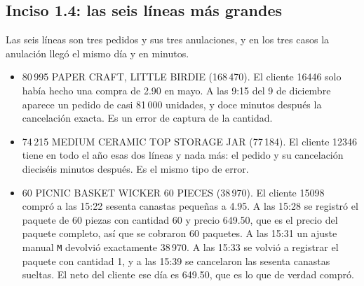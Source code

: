 \documentclass[11pt]{article}
\begin{document}
\subsection*{Inciso 1.4: las seis líneas más grandes}

\begin{table}[H]
\centering
\caption{Las seis líneas con mayor $|$Quantity $\times$ UnitPrice$|$ en los datos crudos.}\label{tab:lineas-grandes}
\end{table}

Las seis líneas son tres pedidos y sus tres anulaciones, y en los tres casos la anulación llegó
el mismo día y en minutos.

\begin{itemize}
\item 80\,995 PAPER CRAFT, LITTLE BIRDIE (\textsterling{}168\,470). El cliente 16446 solo había hecho
una compra de \textsterling{}2.90 en mayo. A las 9:15 del 9 de diciembre aparece un pedido de casi 81\,000
unidades, y doce minutos después la cancelación exacta. Es un error de captura de la cantidad.
\item 74\,215 MEDIUM CERAMIC TOP STORAGE JAR (\textsterling{}77\,184). El cliente 12346 tiene en todo el
año esas dos líneas y nada más: el pedido y su cancelación dieciséis minutos después. Es el
mismo tipo de error.
\item 60 PICNIC BASKET WICKER 60 PIECES (\textsterling{}38\,970). El cliente 15098 compró a las 15:22
sesenta canastas pequeñas a \textsterling{}4.95. A las 15:28 se registró el paquete de 60 piezas con cantidad
60 y precio \textsterling{}649.50, que es el precio del paquete completo, así que se cobraron 60 paquetes. A las
15:31 un ajuste manual \texttt{M} devolvió exactamente \textsterling{}38\,970. A las 15:33 se volvió a registrar
el paquete con cantidad 1, y a las 15:39 se cancelaron las sesenta canastas sueltas. El neto del
cliente ese día es \textsterling{}649.50, que es lo que de verdad compró.
\end{itemize}
\end{document}
